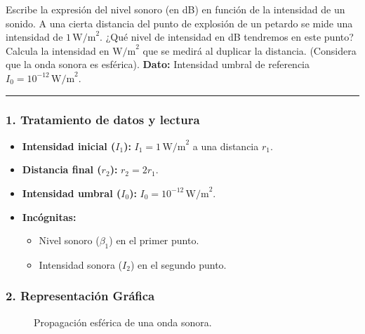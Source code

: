 \begin{cajaenunciado}
Escribe la expresión del nivel sonoro (en dB) en función de la intensidad de un sonido. A una cierta distancia del punto de explosión de un petardo se mide una intensidad de $1\,\text{W/m}^2$. ¿Qué nivel de intensidad en dB tendremos en este punto? Calcula la intensidad en $\text{W/m}^2$ que se medirá al duplicar la distancia. (Considera que la onda sonora es esférica).
\textbf{Dato:} Intensidad umbral de referencia $I_0=10^{-12}\,\text{W/m}^2$.
\end{cajaenunciado}
\hrule

\subsubsection*{1. Tratamiento de datos y lectura}
\begin{itemize}
    \item \textbf{Intensidad inicial ($I_1$):} $I_1 = 1 \, \text{W/m}^2$ a una distancia $r_1$.
    \item \textbf{Distancia final ($r_2$):} $r_2 = 2r_1$.
    \item \textbf{Intensidad umbral ($I_0$):} $I_0 = 10^{-12} \, \text{W/m}^2$.
    \item \textbf{Incógnitas:}
    \begin{itemize}
        \item Nivel sonoro ($\beta_1$) en el primer punto.
        \item Intensidad sonora ($I_2$) en el segundo punto.
    \end{itemize}
\end{itemize}

\subsubsection*{2. Representación Gráfica}
\begin{figure}[H]
    \centering
    \caption{Propagación esférica de una onda sonora.}
\end{figure}

